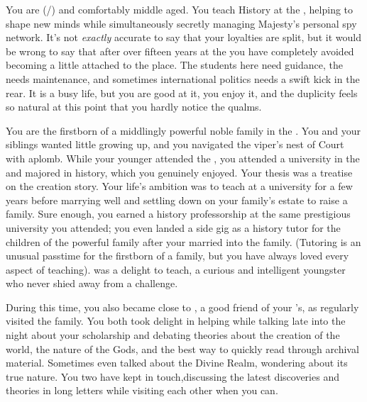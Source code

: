 \documentclass[char]{GL2020}
\begin{document}
\name{\cHistory{}}

You are \cHistory{\full} (\cHistory{\they}/\cHistory{\them}) and comfortably middle aged. You teach History at the \pSchool{}, helping to shape new minds while simultaneously secretly managing \cQueen{\Their} Majesty's personal spy network. It's not \emph{exactly} accurate to say that your loyalties are split, but it would be wrong to say that after over fifteen years at the \pSchool{} you have completely avoided becoming a little attached to the place. The students here need guidance, the \pSc{} needs maintenance, and sometimes international politics needs a swift kick in the rear. It is a busy life, but you are good at it, you enjoy it, and the duplicity feels so natural at this point that you hardly notice the qualms.

You are the firstborn \cHistory{\offspring} of a middlingly powerful noble family in the \pFarm{}. You and your siblings wanted little growing up, and you navigated the viper's nest of Court with aplomb. While your younger \cWildCardFriend{\sibling} \cWildCardFriend{} attended the \pSchool{}, you attended a university in the \pFarm{} and majored in history, which you genuinely enjoyed. Your thesis was a treatise on the creation story. Your life's ambition was to teach at a \pFarm{} university for a few years before marrying well and settling down on your family's estate to raise a family. Sure enough, you earned a history professorship at the same prestigious university you attended; you even landed a side gig as a history tutor for the children of the powerful \cChupStudent{\formal} family after your \cWildCardFriend{\sibling} married into the family. (Tutoring is an unusual passtime for the firstborn of a family, but you have always loved every aspect of teaching). \cChupStudent{\full} was a delight to teach, a curious and intelligent youngster who never shied away from a challenge.

During this time, you also became close to \cWildCard{\full}, a good friend of your \cWildCardFriend{\sibling}’s, as \cWildCard{\they} regularly visited the \cChupStudent{\formal} family. You both took delight in helping \cChupStudent{} while talking late into the night about your scholarship and debating theories about the creation of the world, the nature of the Gods, and the best way to quickly read through archival material. Sometimes \cWildCard{\they} even talked about the Divine Realm, wondering about its true nature. You two have kept in touch,discussing the latest discoveries and theories in long letters while visiting each other when you can. 
\end{document}
